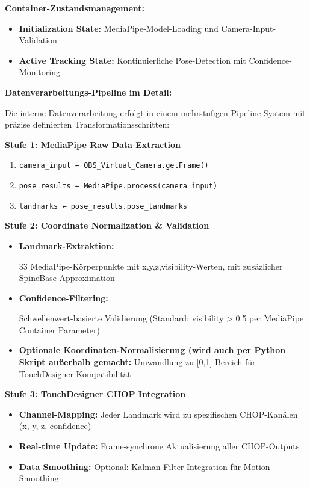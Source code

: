 \textbf{Container-Zustandsmanagement:}
\begin{itemize}
    \item \textbf{Initialization State:} MediaPipe-Model-Loading und Camera-Input-Validation
    \item \textbf{Active Tracking State:} Kontinuierliche Pose-Detection mit Confidence-Monitoring
\end{itemize}

\textbf{Datenverarbeitungs-Pipeline im Detail:}

\raggedright Die interne Datenverarbeitung erfolgt in einem mehrstufigen Pipeline-System mit präzise definierten Transformationsschritten:

\textbf{Stufe 1: MediaPipe Raw Data Extraction}
\begin{enumerate}
    \item \texttt{camera\_input ← OBS\_Virtual\_Camera.getFrame()}
    \item \texttt{pose\_results ← MediaPipe.process(camera\_input)}
    \item \texttt{landmarks ← pose\_results.pose\_landmarks}
\end{enumerate}

\textbf{Stufe 2: Coordinate Normalization \& Validation}
\begin{itemize}
    \item \textbf{Landmark-Extraktion:} \raggedright 33 MediaPipe-Körperpunkte mit x,y,z,visibility-Werten, mit zusäzlicher SpineBase-Approximation
    \item \textbf{Confidence-Filtering:} \raggedright Schwellenwert-basierte Validierung (Standard: visibility > 0.5 per MediaPipe Container Parameter)
    \item \textbf{Optionale Koordinaten-Normalisierung (wird auch per Python Skript außerhalb gemacht:} Umwandlung zu [0,1]-Bereich für TouchDesigner-Kompatibilität
\end{itemize}

\textbf{Stufe 3: TouchDesigner CHOP Integration}
\begin{itemize}
    \item \textbf{Channel-Mapping:} Jeder Landmark wird zu spezifischen CHOP-Kanälen (x, y, z, confidence)
    \item \textbf{Real-time Update:} Frame-synchrone Aktualisierung aller CHOP-Outputs
    \item \textbf{Data Smoothing:} Optional: Kalman-Filter-Integration für Motion-Smoothing
\end{itemize}

